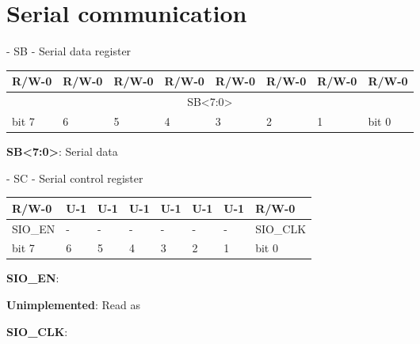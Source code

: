 \documentclass[\main/gbctr.tex]{subfiles}
\begin{document}
\chapter{Serial communication}

\begin{register}[H]
  \caption{ - SB - Serial data register}
  {
    \ttfamily
    \begin{tabularx}{\linewidth}{|X|X|X|X|X|X|X|X|}
      \hline
      R/W-0                          & R/W-0 & R/W-0 & R/W-0 & R/W-0 & R/W-0 & R/W-0 & R/W-0 \\
      \hline
      \multicolumn{8}{|c|}{SB<7:0>} \\
      \hline
      bit 7                          & 6     & 5     & 4     & 3     & 2     & 1     & bit 0 \\
      \hline
    \end{tabularx}{\parfillskip=0pt\par}
  }

  \begin{description}[leftmargin=5em, style=nextline]
    \item[bit 7-0]
      \textbf{SB<7:0>}: Serial data
  \end{description}
\end{register}

\begin{register}[H]
  \caption{ - SC - Serial control register}
  {
    \ttfamily
    \begin{tabularx}{\linewidth}{|X|X|X|X|X|X|X|X|}
      \hline
      R/W-0   & U-1                     & U-1                     & U-1                     & U-1                     & U-1                     & U-1                     & R/W-0    \\
      \hline
      SIO\_EN & \cellcolor{LightGray} - & \cellcolor{LightGray} - & \cellcolor{LightGray} - & \cellcolor{LightGray} - & \cellcolor{LightGray} - & \cellcolor{LightGray} - & SIO\_CLK \\
      \hline
      bit 7   & 6                       & 5                       & 4                       & 3                       & 2                       & 1                       & bit 0    \\
      \hline
    \end{tabularx}{\parfillskip=0pt\par}
  }

  \begin{description}[leftmargin=5em, style=nextline]
    \item[bit 7]
      \textbf{SIO\_EN}:
    \item[bit 6-1]
      \textbf{Unimplemented}: Read as 
    \item[bit 0]
      \textbf{SIO\_CLK}:
  \end{description}
\end{register}
\end{document}
